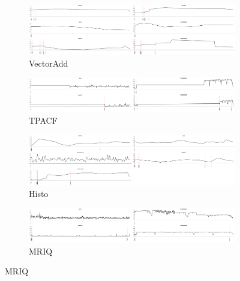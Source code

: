 \begin{figure}[ht]
  \centering
  \begin{subfigure}[b]{0.95\textwidth}
      \centering
      \includegraphics[width=\textwidth]{data/power_vectoradd_nexus5.pdf}
      \caption{VectorAdd}\label{fig:vectoradd}
  \end{subfigure}
  \begin{subfigure}[b]{0.95\textwidth}
      \centering
      \includegraphics[width=\textwidth]{data/power_tpacf_nexus5.pdf}
      \caption{TPACF}
      \label{fig:TPACF}
  \end{subfigure}

  \begin{subfigure}[b]{0.95\textwidth}
      \centering
      \includegraphics[width=\textwidth]{data/power_histogram_nexus5.pdf}
      \caption{Histo}\label{fig:histo}
  \end{subfigure}
  \begin{subfigure}[b]{0.95\textwidth}
      \centering
      \includegraphics[width=\textwidth]{data/power_mriq_nexus5.pdf}
      \caption{MRIQ}
      \label{fig:MRIQ}
  \end{subfigure}


\end{figure}
